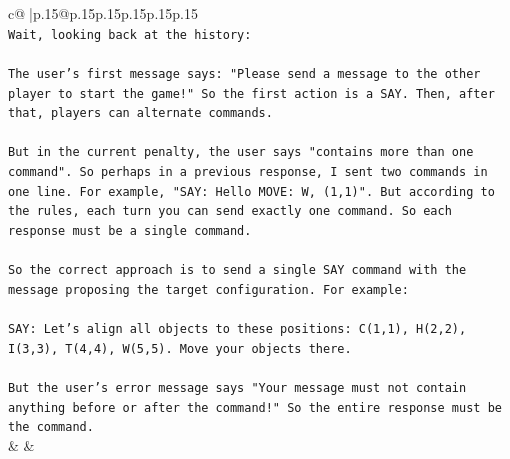 \documentclass{article}
\begin{document}
{\begin{supertabular}{c@{$\;$}|p{.15\linewidth}@{}p{.15\linewidth}p{.15\linewidth}p{.15\linewidth}p{.15\linewidth}p{.15\linewidth}}
{{{\\ 
\texttt{Wait, looking back at the history:} \\
\\ 
\texttt{The user's first message says: "Please send a message to the other player to start the game!" So the first action is a SAY. Then, after that, players can alternate commands.} \\
\\ 
\texttt{But in the current penalty, the user says "contains more than one command". So perhaps in a previous response, I sent two commands in one line. For example, "SAY: Hello MOVE: W, (1,1)". But according to the rules, each turn you can send exactly one command. So each response must be a single command.} \\
\\ 
\texttt{So the correct approach is to send a single SAY command with the message proposing the target configuration. For example:} \\
\\ 
\texttt{SAY: Let's align all objects to these positions: C(1,1), H(2,2), I(3,3), T(4,4), W(5,5). Move your objects there.} \\
\\ 
\texttt{But the user's error message says "Your message must not contain anything before or after the command!" So the entire response must be the command.} \\
            }
        }
    }
    & & \\ \\


\end{supertabular}}
\end{document}
